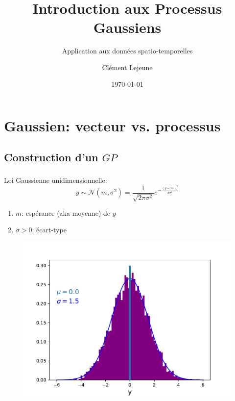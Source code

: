 \documentclass[xcolor=svgnames, t]{beamer}
\title[Introduction aux Processus Gaussiens]{Introduction aux Processus Gaussiens}
\subtitle{Application aux données spatio-temporelles}
\institute[]{}
\author[Cl\'ement Lejeune]{Cl\'ement Lejeune}
\institute[TSN/AD/AD3/IA]{
Thales Services Numériques,
\\ AD/AD3/IA
}
\date{\today}
\begin{document}
\frame{\titlepage}


\section{Gaussien: vecteur vs. processus}
\subsection{Construction d'un $GP$}
\begin{frame}
  \frametitle{\secname}
% 
  Loi Gaussienne unidimensionnelle:
  \begin{equation*}
    y \sim \mathcal{N}(m, \sigma^2) = \frac{1}{\sqrt{2 \pi \sigma^2}} e^{-\frac{(y-m)^2}{2 \sigma^2}}
  \end{equation*}

  \begin{enumerate}
    \item $m$: espérance (aka moyenne) de $y$
    \item $\sigma > 0$: écart-type
  \end{enumerate}


  \begin{figure}
    \includegraphics[scale=0.4]{gaussian_1d.pdf}
  \end{figure}
\end{frame}
\end{document}

